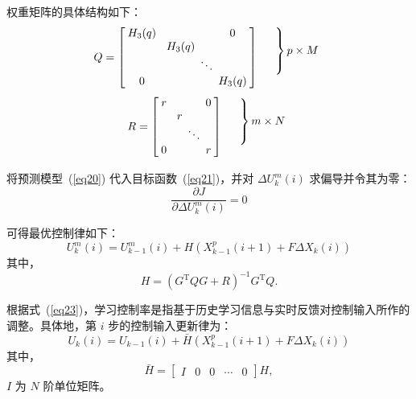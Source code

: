 权重矩阵的具体结构如下：
\begin{equation*}	
	\begin{array}{ccccccccccc}
		\setlength{\arraycolsep}{0.8mm}
		Q=
		\left[
		\begin{array}{cccccccccc}
			H_{3}(q)& & &&0\\		
			& &H_{3}(q)&&\\
			& & &\ddots &\\ 
			0&& & &H_{3}(q) 
		\end{array}
		\right] 
		&
		\begin{array}{cc}
			\left.\rule{0mm}{8mm}\right\}p\times M \\ \hfill
		\end{array}		
	\end{array}
\end{equation*}
\begin{equation*}	
	\begin{array}{ccccccccccc}
		\setlength{\arraycolsep}{0.8mm}
		R=
		\left[
		\begin{array}{cccccccccc}
			r& & &&0\\		
			& &r&&\\
			& & &\ddots &\\ 
			0&& & &r
		\end{array}
		\right] 
		&
		\begin{array}{cc}
			\left.\rule{0mm}{9mm}\right\}m\times N \\ \hfill
		\end{array}		
	\end{array}
\end{equation*}

将预测模型~(\ref{eq20}) 代入目标函数~(\ref{eq21})，并对 $\Delta U_k^m(i)$ 求偏导并令其为零：
\begin{equation}
\frac{\partial J}{\partial \Delta U_k^m(i)}=0
\label{eq22}
\end{equation}

可得最优控制律如下：
\begin{equation}
U_k^m(i)=U_{k-1}^m(i)+H\left(X_{k-1}^p(i+1)+F \Delta X_k(i)\right) 
\label{eq23}
\end{equation}
其中，
\begin{equation*}
	H=\left(G^{\mathrm{T}} Q G+R\right)^{-1} G^{\mathrm{T}} Q.
\end{equation*}

根据式~(\ref{eq23})，学习控制率是指基于历史学习信息与实时反馈对控制输入所作的调整。具体地，第 $i$ 步的控制输入更新律为：
\begin{equation}
U_k(i)=U_{k-1}(i)+\bar{H}\left(X_{k-1}^p(i+1)+F \Delta X_k(i)\right)
\label{eq24}
\end{equation}
其中，
\begin{equation*}
	\bar{H}=\left[\begin{array}{lllll}
		I & 0 & 0 & \cdots & 0
	\end{array}\right] H,
\end{equation*}
$I$ 为 $N$ 阶单位矩阵。

